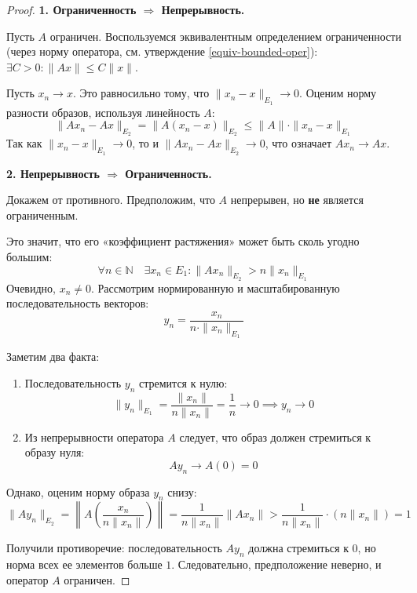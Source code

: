 \begin{proof}
	\textbf{1. Ограниченность $\Rightarrow$ Непрерывность.}
	
	Пусть $A$ ограничен. Воспользуемся эквивалентным определением ограниченности (через норму оператора, см. утверждение \ref{equiv-bounded-oper}): $\exists C > 0: \|Ax\| \leqslant C\|x\|$.
	
	Пусть $x_n \to x$. Это равносильно тому, что $\|x_n - x\|_{E_1} \to 0$. Оценим норму разности образов, используя линейность $A$:
	\[
	\|Ax_n - Ax\|_{E_2} = \|A(x_n - x)\|_{E_2} \leqslant \|A\| \cdot \|x_n - x\|_{E_1}
	\]
	Так как $\|x_n - x\|_{E_1} \to 0$, то и $\|Ax_n - Ax\|_{E_2} \to 0$, что означает $Ax_n \to Ax$.
	
	\textbf{2. Непрерывность $\Rightarrow$ Ограниченность.}
	
	Докажем от противного. Предположим, что $A$ непрерывен, но \textbf{не} является ограниченным.
	
	Это значит, что его «коэффициент растяжения» может быть сколь угодно большим:
	\[ \forall n \in \mathbb{N} \quad \exists x_n \in E_1 : \|Ax_n\|_{E_2} > n \|x_n\|_{E_1} \]
	Очевидно, $x_n \neq 0$. Рассмотрим нормированную и масштабированную последовательность векторов:
	\[ y_n = \frac{x_n}{n \cdot \|x_n\|_{E_1}} \]
	
	Заметим два факта:
	\begin{enumerate}
		\item Последовательность $y_n$ стремится к нулю:
		\[ \|y_n\|_{E_1} = \frac{\|x_n\|}{n \|x_n\|} = \frac{1}{n} \to 0 \implies y_n \to 0 \]
		\item Из непрерывности оператора $A$ следует, что образ должен стремиться к образу нуля:
		\[ A y_n \to A(0) = 0 \]
	\end{enumerate}
	
	Однако, оценим норму образа $y_n$ снизу:
	\[ \|A y_n\|_{E_2} = \left\| A \left( \frac{x_n}{n \|x_n\|} \right) \right\| = \frac{1}{n \|x_n\|} \|A x_n\| > \frac{1}{n \|x_n\|} \cdot (n \|x_n\|) = 1 \]
	
	Получили противоречие: последовательность $A y_n$ должна стремиться к $0$, но норма всех ее элементов больше $1$. Следовательно, предположение неверно, и оператор $A$ ограничен.
\end{proof}

